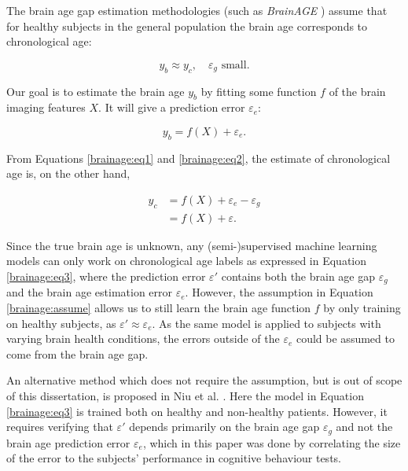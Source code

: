 The brain age gap estimation methodologies (such as \textit{BrainAGE} \cite{franke2019ten}) assume that for healthy subjects in the general population the brain age corresponds to chronological age:

\begin{equation}
    \label{brainage:assume}
    y_b \approx y_c,\quad \varepsilon_g \text{ small}.
\end{equation}

Our goal is to estimate the brain age $y_b$ by fitting some function $f$ of the brain imaging features $X$. It will give a prediction error $\varepsilon_e$:

\begin{equation}
    \label{brainage:eq2}
    y_b = f(X) + \varepsilon_e.
\end{equation}

From Equations \ref{brainage:eq1} and \ref{brainage:eq2}, the estimate of chronological age is, on the other hand,

\begin{align}
    y_c &= f(X) + \varepsilon_e - \varepsilon_g \\
        \label{brainage:eq3}
        &= f(X) + \varepsilon.
\end{align}

Since the true brain age is unknown, any (semi-)supervised machine learning models can only work on chronological age labels as expressed in Equation \ref{brainage:eq3}, where the prediction error $\varepsilon'$ contains both the brain age gap $\varepsilon_g$ and the brain age estimation error $\varepsilon_e$. However, the assumption in Equation \ref{brainage:assume} allows us to still learn the brain age function $f$ by only training on healthy subjects, as $\varepsilon' \approx \varepsilon_e$. As the same model is applied to subjects with varying brain health conditions, the errors outside of the $\varepsilon_e$ could be assumed to come from the brain age gap.  

An alternative method which does not require the assumption, but is out of scope of this dissertation, is proposed in Niu et al. \cite{niu2019improved}. Here the model in Equation \ref{brainage:eq3} is trained both on healthy and non-healthy patients. However, it requires verifying that $\varepsilon'$ depends primarily on the brain age gap $\varepsilon_g$ and not the brain age prediction error $\varepsilon_e$, which in this paper was done by correlating the size of the error to the subjects' performance in cognitive behaviour tests.

